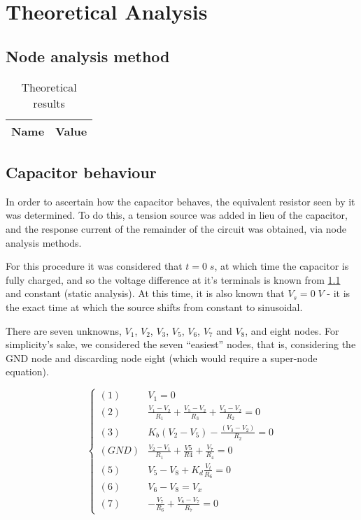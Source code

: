 \section{Theoretical Analysis}
\label{sec:analysis}

\subsection{Node analysis method}
\label{sec:node}

\begin{table}[H]
  \centering
  \begin{tabular}{|c|c|}
    \hline
        {\bf Name} & {\bf Value} \\
        \hline
        \hline
        
        \hline
  \end{tabular}
  \caption{Theoretical results}
  \label{mesh_res}
\end{table}

\subsection{Capacitor behaviour}
\label{sec:Req}

In order to ascertain how the capacitor behaves, the equivalent resistor seen by it was determined. To do this, a tension source was added in lieu of the capacitor, and the response current of the remainder of the circuit was obtained, via node analysis methods.

For this procedure it was considered that $t=0\;s$, at which time the capacitor is fully charged, and so the voltage difference at it's terminals is known from \ref{sec:node} and constant (static analysis). At this time, it is also known that $V_s=0\;V$ - it is the exact time at which the source shifts from constant to sinusoidal.


There are seven unknowns, $V_1$, $V_2$, $V_3$, $V_5$, $V_6$, $V_7$ and $V_8$, and eight nodes. For simplicity's sake, we considered the seven ``easiest'' nodes, that is, considering the GND node and discarding node eight (which would require a super-node equation).

\begin{equation}
  \begin{cases}
    (1) & V_1=0 \\
    (2) & \frac{V_1-V_2}{R_1} + \frac{V_5-V_2}{R_3} + \frac{V_3-V_2}{R_2} = 0 \\
    (3) & K_b (V_2-V_5)-\frac{(V_3-V_2)}{R_2} = 0 \\
    (GND) & \frac{V_2-V_1}{R_1} + \frac{V5}{R4} + \frac{V_7}{R_4} = 0 \\
    (5) & V_5-V_8 + K_d \frac{V_t}{R_6} = 0 \\
    (6) & V_6-V_8 = V_x \\
    (7) & -\frac{V_7}{R_6} + \frac{V_8-V_7}{R_7} = 0
  \end{cases}
\end{equation}

